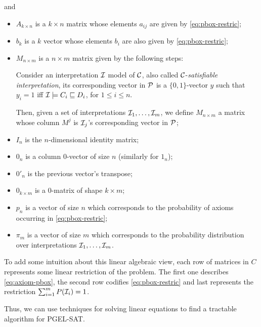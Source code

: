 and
\begin{itemize}
	\item $A_{k \times n}$ is a $k \times n$ matrix whose elements $a_{ij}$ are given by \cref{eq:pbox-restric};
	\item $b_k$ is a $k$ vector whose elements $b_i$ are also given by \cref{eq:pbox-restric};
	\item $M_{n \times m}$ is a $n \times m$ matrix given by the following steps:

	      Consider an interpretation $\mathcal{I}$ model of $\mathcal{C}$, also called $\mathcal{C}$-\emph{satisfiable interpretation}, its corresponding vector in $\mathcal{P}$ is  a $\{0, 1\}$-vector $y$ such that $y_i = 1$ iff $\mathcal{I} \models C_i \sqsubseteq D_i$, for $1 \leq i \leq n$.

	      Then, given a set of interpretations $\mathcal{I}_1, \dots, \mathcal{I}_m$, we define $M_{n \times m}$ a matrix whose column $M^j$ is $\mathcal{I}_j$'s corresponding vector in $\mathcal{P}$;
	\item $I_n$ is the $n$-dimensional identity matrix;
	\item $0_n$ is a column $0$-vector of size $n$ (similarly for $1_n$);
	\item $0'_n$ is the previous vector's transpose;
	\item $0_{k \times m}$ is a $0$-matrix of shape $k \times m$;
	\item $p_n$ is a vector of size $n$ which corresponds to the probability of axioms occurring in \cref{eq:pbox-restric};
	\item $\pi_m$ is a vector of size $m$ which corresponds to the probability distribution over interpretations $\mathcal{I}_1, \dots, \mathcal{I}_m$.
\end{itemize}

To add some intuition about this linear algebraic view, each row of matrices in $C$ represents some linear restriction of the problem. The first one describes \cref{eq:axiom-pbox}, the second row codifies \cref{eq:pbox-restric} and last represents the restriction $\sum_{i = 1}^m P(\mathcal{I}_i) = 1$. 


Thus, we can use techniques for solving linear equations to find a tractable algorithm for PGEL-SAT.